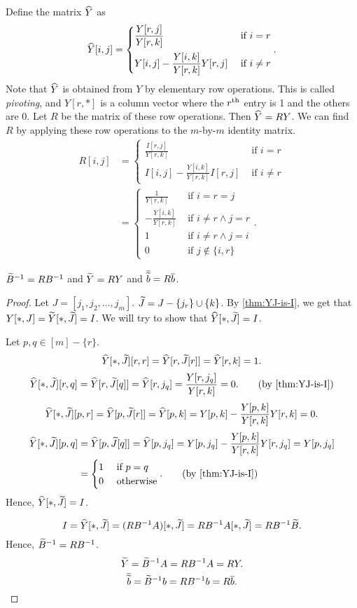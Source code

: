 Define the matrix $\widehat{Y}$ as
\[ \widehat{Y}[i,j] = \begin{cases}
\displaystyle \frac{Y[r,j]}{Y[r,k]} & \textrm{ if } i = r
\\[1em] \displaystyle Y[i,j] - \frac{Y[i,k]}{Y[r,k]}Y[r,j] & \textrm{ if } i \neq r
\end{cases}. \]
Note that $\widehat{Y}$ is obtained from $Y$ by elementary row operations.
This is called \emph{pivoting}, and $Y[r,*]$ is a column vector where
the $r^{\textrm{th}}$ entry is 1 and the others are 0.
Let $R$ be the matrix of these row operations. Then $\widehat{Y} = RY$.
We can find $R$ by applying these row operations to the $m$-by-$m$ identity matrix.
\begin{align*}
R[i,j] &= \begin{cases}
\displaystyle \frac{I[r,j]}{Y[r,k]} & \textrm{ if } i = r
\\[1em] \displaystyle I[i,j] - \frac{Y[i,k]}{Y[r,k]}I[r,j] & \textrm{ if } i \neq r
\end{cases}
\\ &= \begin{cases}
\displaystyle \frac{1}{Y[r,k]} & \textrm{ if } i = r = j
\\[1em] \displaystyle -\frac{Y[i,k]}{Y[r,k]} & \textrm{ if } i \neq r \land j = r
\\ \displaystyle 1 & \textrm{ if } i \neq r \land j = i
\\ \displaystyle 0 & \textrm{ if } j \not\in \{i, r\}
\end{cases}.
\end{align*}

\begin{lemma}
\label{thm:upd-Y}
$\widetilde{B}^{-1} = RB^{-1}$ and $\widetilde{Y} = RY$ and $\overline{\widetilde{b}} = R\overline{b}$.
\end{lemma}
\begin{proof}
Let $J = [j_1, j_2, \ldots, j_m]$. $\widetilde{J} = J - \{j_r\} \cup \{k\}$.
By \cref{thm:YJ-is-I}, we get that $Y[*,J] = \widetilde{Y}[*,\widetilde{J}] = I$.
We will try to show that $\widehat{Y}[*,\widetilde{J}] = I$.

Let $p, q \in [m] - \{r\}$.
\[ \widehat{Y}[*,\widetilde{J}][r,r] = \widehat{Y}[r,\widetilde{J}[r]] = \widehat{Y}[r,k] = 1. \]
\[ \Yhat[*,\Jtild][r,q] = \Yhat[r,\Jtild[q]] = \Yhat[r,j_q] = \frac{Y[r,j_q]}{Y[r,k]} = 0.
    \tag{by \cref{thm:YJ-is-I}} \]
\[ \widehat{Y}[*,\widetilde{J}][p,r] = \widehat{Y}[p,\widetilde{J}[r]] = \widehat{Y}[p,k]
    = Y[p,k] - \frac{Y[p,k]}{Y[r,k]}Y[r,k] = 0. \]
\begin{align*}
\Yhat[*,\Jtild][p,q] &= \Yhat[p,\Jtild[q]] = \Yhat[p,j_q]
= Y[p,j_q] - \frac{Y[p,k]}{Y[r,k]}Y[r,j_q] = Y[p,j_q]
\\ &= \begin{cases}1 & \textrm{ if } p = q \\ 0 & \textrm{ otherwise}\end{cases}.
\tag{by \cref{thm:YJ-is-I}}
\end{align*}
Hence, $\widehat{Y}[*,\widetilde{J}] = I$.

\[ I = \widehat{Y}[*,\widetilde{J}] = (RB^{-1}A)[*,\widetilde{J}] = RB^{-1}A[*,\widetilde{J}] = RB^{-1}\widetilde{B}. \]
Hence, $\widetilde{B}^{-1} = RB^{-1}$.
\[ \widetilde{Y} = \widetilde{B}^{-1}A = RB^{-1}A = RY. \]
\[ \overline{\widetilde{b}} = \widetilde{B}^{-1}b = RB^{-1}b = R\overline{b}. \qedhere \]
\end{proof}

